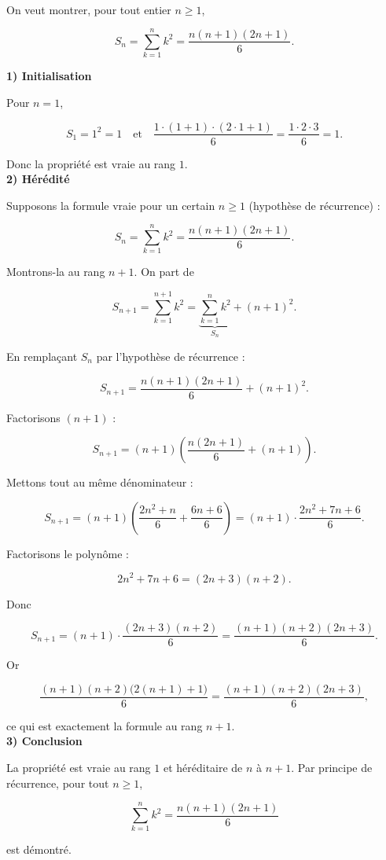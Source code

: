\begin{solution}
    \text{ }\\
    On veut montrer, pour tout entier $n\ge 1$,
    
    $$
    S_n=\sum_{k=1}^n k^2=\frac{n(n+1)(2n+1)}{6}.
    $$

\textbf{1) Initialisation}

Pour $n=1$,

$$
S_1=1^2=1
\quad\text{et}\quad
\frac{1\cdot(1+1)\cdot(2\cdot1+1)}{6}=\frac{1\cdot2\cdot3}{6}=1.
$$

Donc la propriété est vraie au rang $1$. \\

\textbf{2) Hérédité}

Supposons la formule vraie pour un certain $n\ge1$ (hypothèse de récurrence) :

$$
S_n=\sum_{k=1}^n k^2=\frac{n(n+1)(2n+1)}{6}.
$$

Montrons-la au rang $n+1$. On part de

$$
S_{n+1}=\sum_{k=1}^{n+1}k^2
= \underbrace{\sum_{k=1}^{n}k^2}_{S_n} + (n+1)^2.
$$

En remplaçant $S_n$ par l’hypothèse de récurrence :

$$
S_{n+1}=\frac{n(n+1)(2n+1)}{6}+(n+1)^2.
$$

Factorisons $(n+1)$ :

$$
S_{n+1}
=(n+1)\left(\frac{n(2n+1)}{6} + (n+1)\right).
$$

Mettons tout au même dénominateur :

$$
S_{n+1}
=(n+1)\left(\frac{2n^2+n}{6} + \frac{6n+6}{6}\right)
=(n+1)\cdot \frac{2n^2+7n+6}{6}.
$$

Factorisons le polynôme :

$$
2n^2+7n+6=(2n+3)(n+2).
$$

Donc

$$
S_{n+1}=(n+1)\cdot \frac{(2n+3)(n+2)}{6}
=\frac{(n+1)(n+2)(2n+3)}{6}.
$$

Or

$$
\frac{(n+1)(n+2)\big(2(n+1)+1\big)}{6}
=\frac{(n+1)(n+2)(2n+3)}{6},
$$

ce qui est exactement la formule au rang $n+1$. \\

\textbf{3) Conclusion}

La propriété est vraie au rang $1$ et héréditaire de $n$ à $n+1$. Par principe de récurrence, pour tout $n\ge1$,

$$
\boxed{\;\sum_{k=1}^n k^2=\frac{n(n+1)(2n+1)}{6}\;}
$$

est démontré.

\end{solution}

